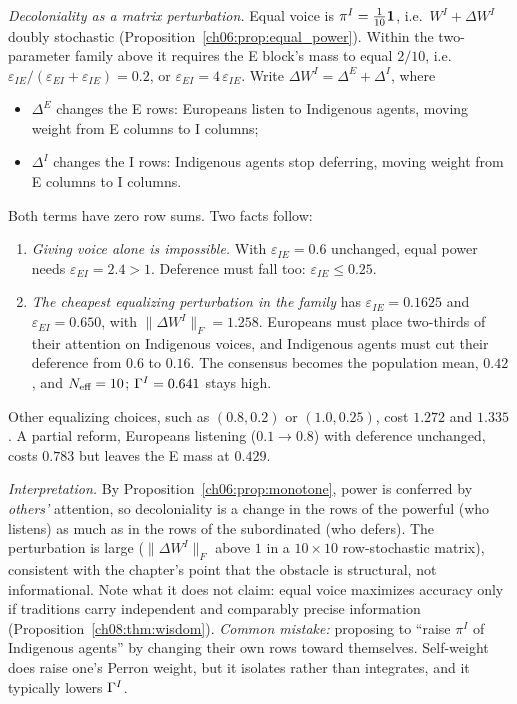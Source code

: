 \documentclass[../solutions_manual.tex]{subfiles}
\begin{document}
 \emph{Decoloniality as a matrix perturbation.} Equal voice is $\pi^I = \frac{1}{10}\mathbf{1}$, i.e.\ $W^I + \Delta W^I$ doubly stochastic (Proposition~\ref{ch06:prop:equal_power}). Within the two-parameter family above it requires the E block's mass to equal $2/10$, i.e.\ $\varepsilon_{IE}/(\varepsilon_{EI} + \varepsilon_{IE}) = 0.2$, or $\varepsilon_{EI} = 4\,\varepsilon_{IE}$. Write $\Delta W^I = \Delta^{E} + \Delta^{I}$, where
\begin{itemize}
\item $\Delta^{E}$ changes the E rows: Europeans listen to Indigenous agents, moving weight from E columns to I columns;
\item $\Delta^{I}$ changes the I rows: Indigenous agents stop deferring, moving weight from E columns to I columns.
\end{itemize}
Both terms have zero row sums. Two facts follow:
\begin{enumerate}
\item \emph{Giving voice alone is impossible.} With $\varepsilon_{IE} = 0.6$ unchanged, equal power needs $\varepsilon_{EI} = 2.4 > 1$. Deference must fall too: $\varepsilon_{IE} \le 0.25$.
\item \emph{The cheapest equalizing perturbation in the family} has $\varepsilon_{IE} = 0.1625$ and $\varepsilon_{EI} = 0.650$, with $\|\Delta W^I\|_F = 1.258$. Europeans must place two-thirds of their attention on Indigenous voices, and Indigenous agents must cut their deference from $0.6$ to $0.16$. The consensus becomes the population mean, $0.42$, and $N_{\text{eff}} = 10$; $\Gamma^I = 0.641$ stays high.
\end{enumerate}
Other equalizing choices, such as $(0.8, 0.2)$ or $(1.0, 0.25)$, cost $1.272$ and $1.335$. A partial reform, Europeans listening ($0.1 \to 0.8$) with deference unchanged, costs $0.783$ but leaves the E mass at $0.429$.

\emph{Interpretation.} By Proposition~\ref{ch06:prop:monotone}, power is conferred by \emph{others'} attention, so decoloniality is a change in the rows of the powerful (who listens) as much as in the rows of the subordinated (who defers). The perturbation is large ($\|\Delta W^I\|_F$ above $1$ in a $10 \times 10$ row-stochastic matrix), consistent with the chapter's point that the obstacle is structural, not informational. Note what it does not claim: equal voice maximizes accuracy only if traditions carry independent and comparably precise information (Proposition~\ref{ch08:thm:wisdom}). \emph{Common mistake:} proposing to ``raise $\pi^I$ of Indigenous agents'' by changing their own rows toward themselves. Self-weight does raise one's Perron weight, but it isolates rather than integrates, and it typically lowers $\Gamma^I$.
\end{document}
